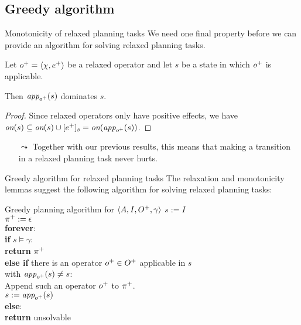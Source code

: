 \documentclass{gkibeamer}
\begin{document}
\subsection{Greedy algorithm}

\begin{frame}{Monotonicity of relaxed planning tasks}
  We need one final property before we can provide an algorithm for
  solving relaxed planning tasks.
  \begin{lemma}[monotonicity]
    Let ${o}^+ = \langle \chi, {e}^+\rangle$ be a
    relaxed operator and let $s$ be a state in which ${o}^+$
    is applicable.
    
    Then $\textit{app}_{{o}^+}(s)$ dominates $s$.
  \end{lemma}

  \begin{proof}
    Since relaxed operators only have positive effects,
    we have
    $\textit{on}(s) \subseteq \textit{on}(s) \cup \lbrack {e}^+\rbrack_{s} = 
    \textit{on}(\textit{app}_{{o}^+}(s))$.
  \end{proof}

  \begin{itemize}
  \item[$\leadsto$] Together with our previous results, this means
    that making a transition in a relaxed planning task \alert{never}
    hurts.
  \end{itemize}
\end{frame}

\begin{frame}{Greedy algorithm for relaxed planning tasks}
  The relaxation and monotonicity lemmas suggest the following
  algorithm for solving relaxed planning tasks:
  \begin{block}{Greedy planning algorithm for
      $\langle A, I, {O}^+, \gamma\rangle$}
    $s := I$ \\
    ${\pi}^+ := \epsilon$ \\
    \textbf{forever}: \\
    {}\qquad \textbf{if} $s \models \gamma$: \\
    {}\qquad\qquad \textbf{return} ${\pi}^+$ \\
    {}\qquad \textbf{else if} there is an operator ${o}^+ \in
    {O}^+$ applicable in $s$ \\
    {}\qquad {} with
    $\textit{app}_{{o}^+}(s) \neq s$: \\
    {}\qquad\qquad Append such an operator ${o}^+$ to ${\pi}^+$. \\
    {}\qquad\qquad $s := \textit{app}_{{o}^+}(s)$ \\
    {}\qquad \textbf{else}: \\
    {}\qquad\qquad \textbf{return} unsolvable
  \end{block}
\end{frame}
\end{document}
